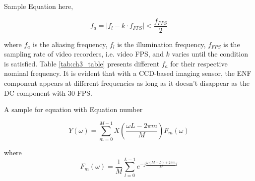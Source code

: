 Sample Equation here,

$$f_{a} = | f_{l} - k \cdot f_{FPS} | < \frac{f_{FPS}}{2}$$   

\noindent where $ f_{a} $ is the aliasing frequency, $ f_{l} $ is the illumination frequency, $ f_{FPS} $ is the sampling rate of video recorders, i.e. video FPS, and $k$ varies until the condition is satisfied. Table \ref{tab:ch3_table} presents different $ f_{a} $ for their respective nominal frequency. It is evident that with a CCD-based imaging sensor, the ENF component appears at different frequencies as long as it doesn't disappear as the DC component with $30$ FPS. 


A sample for equation with Equation number 

\begin{equation}
  Y(\omega) =  \sum_{m=0}^{M-1}   X\left( \frac{\omega L - 2 \pi m}{M} \right) F_m(\omega) \label{eq:ch3_freq_filter_bank}   
\end{equation}
  
\noindent where $$F_m(\omega) =   \frac{1}{M}  \sum_{l=0}^{L-1}  e^{-j\frac{\omega(M - L) + 2 \pi m}{M}l} $$


